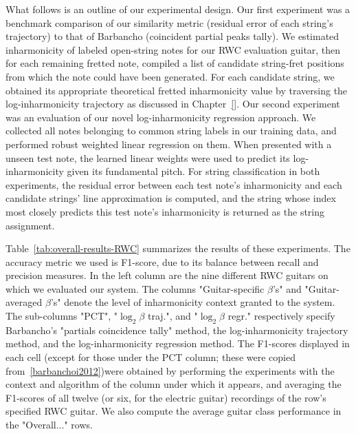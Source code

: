\documentclass[12pt]{cmuthesis}
\begin{document}
What follows is an outline of our experimental design. Our first experiment was a benchmark comparison of our similarity metric (residual error of each string's trajectory) to that of Barbancho (coincident partial peaks tally). We estimated inharmonicity of labeled open-string notes for our RWC evaluation guitar, then for each remaining fretted note, compiled a list of candidate string-fret positions from which the note could have been generated. For each candidate string, we obtained its appropriate theoretical fretted inharmonicity value by traversing the log-inharmonicity trajectory as discussed in Chapter~\ref{}. Our second experiment was an evaluation of our novel log-inharmonicity regression approach. We collected all notes belonging to common string labels in our training data, and performed robust weighted linear regression on them. When presented with a unseen test note, the learned linear weights were used to predict its log-inharmonicity given its fundamental pitch. For string classification in both experiments, the residual error between each test note's inharmonicity and each candidate strings' line approximation is computed, and the string whose index most closely predicts this test note's inharmonicity is returned as the string assignment.

Table~\ref{tab:overall-results-RWC} summarizes the results of these experiments. The accuracy metric we used is F1-score, due to its balance between recall and precision measures. In the left column are the nine different RWC guitars on which we evaluated our system. The columns "Guitar-specific $\beta$'s" and "Guitar-averaged $\beta$'s" denote the level of inharmonicity context granted to the system. The sub-columns "PCT", "$\log_2\beta $ traj.", and "$\log_2\beta$ regr." respectively specify Barbancho's "partials coincidence tally" method, the log-inharmonicity trajectory method, and the log-inharmonicity regression method. The F1-scores displayed in each cell (except for those under the PCT column; these were copied from~\ref{barbanchoi2012})were obtained by performing the experiments with the context and algorithm of the column under which it appears, and averaging the F1-scores of all twelve (or six, for the electric guitar) recordings of the row's specified RWC guitar. We also compute the average guitar class performance in the "Overall..." rows.

\end{document}
